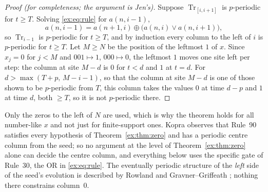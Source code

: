 \documentclass[11pt]{article}
\theoremstyle{definition}
\theoremstyle{remark}
\newcommand{\Tr}{\operatorname{Tr}}
\begin{document}
\begin{proof}[Proof (for completeness; the argument is Jen's)]
Suppose $\Tr_{[i,i+1]}$ is $p$-periodic for $t\ge T$. Solving \eqref{ex:eq:rule} for $a(n,i-1)$,
\begin{equation}\label{ex:eq:left}
a(n,i-1)=a(n+1,i)\oplus\bigl(a(n,i)\vee a(n,i+1)\bigr),
\end{equation}
so $\Tr_{i-1}$ is $p$-periodic for $t\ge T$, and by induction every column to the left of $i$ is $p$-periodic for $t\ge T$. Let $M\ge N$ be the position of the leftmost $1$ of $x$. Since $x_j=0$ for $j<M$ and $001\mapsto1$, $000\mapsto0$, the leftmost $1$ moves one site left per step: the column at site $M-d$ is $0$ for $t<d$ and $1$ at $t=d$. For $d>\max(T+p,\,M-i-1)$, so that the column at site $M-d$ is one of those shown to be $p$-periodic from $T$, this column takes the values $0$ at time $d-p$ and $1$ at time $d$, both $\ge T$, so it is not $p$-periodic there.
\end{proof}

Only the zeros to the left of $N$ are used, which is why the theorem holds for all number-like $x$ and not just for finite-support ones. Kopra \cite[closing remarks]{Kopra} observes that Rule~90 satisfies every hypothesis of Theorem~\ref{ex:thm:zero} and has a periodic centre column from the seed; so no argument at the level of Theorem~\ref{ex:thm:zero} alone can decide the centre column, and everything below uses the specific gate of Rule~30, the OR in \eqref{ex:eq:rule}. The eventually periodic structure of the \emph{left} side of the seed's evolution is described by Rowland \cite{Rowland} and Gravner--Griffeath \cite{GG}; nothing there constrains column~$0$.
\end{document}
